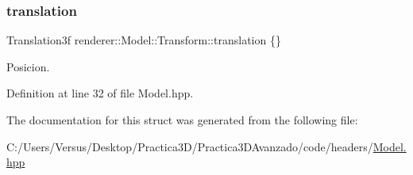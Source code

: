 \mbox{\label{structrenderer_1_1_model_1_1_transform_ad2274abae9bed064000673eb37d3f742}} 
\subsubsection{\texorpdfstring{translation}{translation}}
{\footnotesize\ttfamily Translation3f renderer\+::\+Model\+::\+Transform\+::translation \{\}}

Posicion. 

Definition at line 32 of file Model.\+hpp.



The documentation for this struct was generated from the following file\+:\begin{DoxyCompactItemize}
\item 
C\+:/\+Users/\+Versus/\+Desktop/\+Practica3\+D/\+Practica3\+D\+Avanzado/code/headers/\mbox{\hyperlink{_model_8hpp}{Model.\+hpp}}\end{DoxyCompactItemize}
